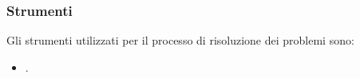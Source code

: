 \subsubsection{Strumenti}
Gli strumenti utilizzati per il processo di risoluzione dei problemi sono:
\begin{itemize}
    \item {}.
\end{itemize}